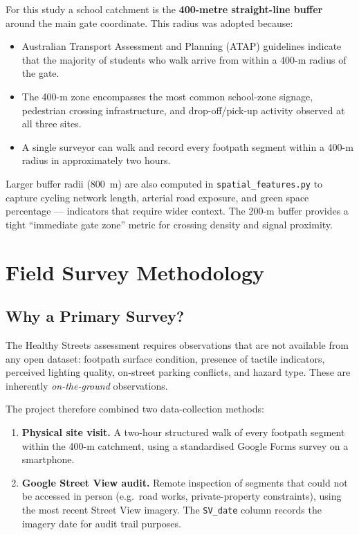 \documentclass[11pt,a4paper,openany]{book}
\begin{document}
For this study a school catchment is the \textbf{400-metre straight-line buffer} around the main gate coordinate. This radius was adopted because:

\begin{itemize}
  \item Australian Transport Assessment and Planning (ATAP) guidelines indicate that the majority of students who walk arrive from within a 400-m radius of the gate.
  \item The 400-m zone encompasses the most common school-zone signage, pedestrian crossing infrastructure, and drop-off/pick-up activity observed at all three sites.
  \item A single surveyor can walk and record every footpath segment within a 400-m radius in approximately two hours.
\end{itemize}

Larger buffer radii (800~m) are also computed in \texttt{spatial\_features.py} to capture cycling network length, arterial road exposure, and green space percentage --- indicators that require wider context. The 200-m buffer provides a tight ``immediate gate zone'' metric for crossing density and signal proximity.

\chapter{Field Survey Methodology}

\section{Why a Primary Survey?}

The Healthy Streets assessment requires observations that are not available from any open dataset: footpath surface condition, presence of tactile indicators, perceived lighting quality, on-street parking conflicts, and hazard type. These are inherently \emph{on-the-ground} observations.

The project therefore combined two data-collection methods:

\begin{enumerate}
  \item \textbf{Physical site visit.} A two-hour structured walk of every footpath segment within the 400-m catchment, using a standardised Google Forms survey on a smartphone.
  \item \textbf{Google Street View audit.} Remote inspection of segments that could not be accessed in person (e.g.\ road works, private-property constraints), using the most recent Street View imagery. The \texttt{SV\_date} column records the imagery date for audit trail purposes.
\end{enumerate}
\end{document}
